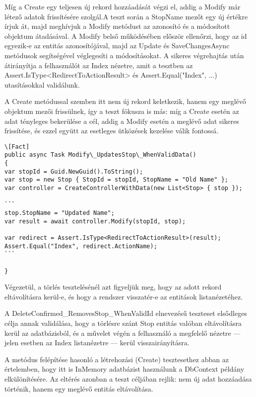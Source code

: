 Míg a Create egy teljesen új rekord hozzáadását végzi el, addig a Modify már létező adatok frissítésére szolgál.A teszt során a StopName mezőt egy új értékre írjuk át, majd meghívjuk a Modify metódust az azonosító és a módosított objektum átadásával. A Modify belső működésében először ellenőrzi, hogy az id egyezik-e az entitás azonosítójával, majd az Update és SaveChangesAsync metódusok segítségével véglegesíti a módosításokat. A sikeres végrehajtás után átirányítja a felhasználót az Index nézetre, amit a tesztben az Assert.IsType<RedirectToActionResult> és Assert.Equal("Index", ...) utasításokkal validálunk.

A Create metódussal szemben itt nem új rekord keletkezik, hanem egy meglévő objektum mezői frissülnek, így a teszt fókusza is más: míg a Create esetén az adat tényleges bekerülése a cél, addig a Modify esetén a meglévő adat sikeres frissítése, és ezzel együtt az esetleges ütközések kezelése válik fontossá.



\begin{lstlisting}
\[Fact]
public async Task Modify\_UpdatesStop\_WhenValidData()
{
var stopId = Guid.NewGuid().ToString();
var stop = new Stop { StopId = stopId, StopName = "Old Name" };
var controller = CreateControllerWithData(new List<Stop> { stop });

```
stop.StopName = "Updated Name";
var result = await controller.Modify(stopId, stop);

var redirect = Assert.IsType<RedirectToActionResult>(result);
Assert.Equal("Index", redirect.ActionName);
```

}
\end{lstlisting}

 Végezetül, a törlés tesztelésénél azt figyeljük meg, hogy az adott rekord eltávolításra kerül-e, és hogy a rendszer visszatér-e az entitások listanézetéhez.

A DeleteConfirmed\_RemovesStop\_WhenValidId elnevezésű teszteset elsődleges célja annak validálása, hogy a törlésre szánt Stop entitás valóban eltávolításra kerül az adatbázisból, és a művelet végén a felhasználó a megfelelő nézetre — jelen esetben az Index listanézetre — kerül visszairányításra.

A metódus felépítése hasonló a létrehozási (Create) tesztesethez abban az értelemben, hogy itt is InMemory adatbázist használunk a DbContext példány elkülönítésére. Az eltérés azonban a teszt céljában rejlik: nem új adat hozzáadása történik, hanem egy meglévő entitás eltávolítása.

